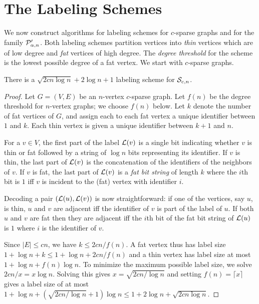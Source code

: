 
\section{The Labeling Schemes}
\label{sec:lab_schem}
We now construct algorithms for labeling schemes for $c$-sparse graphs and for the family $ \mathcal{P}'_{\alpha,n}$. Both labeling schemes partition vertices into \emph{thin} vertices which are of low degree and \emph{fat} vertices of high degree. The \emph{degree threshold} for the scheme is the lowest possible degree of a fat vertex. We start with $c$-sparse graphs.
\begin{theorem}\label{sparse-label}
There is a $\sqrt{2cn\log n} + 2\log n + 1$ labeling scheme for $ \mathcal{S}_{c,n}$.
\end{theorem}
\begin{proof}
Let $G=(V,E)$ be an $n$-vertex $c$-sparse graph. Let $f(n)$ be the degree threshold for $n$-vertex graphs; we choose $f(n)$ below. Let $k$ denote the number of fat vertices of $G$, and assign each to each fat vertex a unique identifier between $1$ and $k$. Each thin vertex is given a unique identifier between $k+1$ and $n$.

For a $v\in V$, the first part of the label $ \mathcal{L}(v)$ is a single bit indicating whether $v$ is thin or fat followed by a string of $\log n$ bits representing its identifier. If $v$ is thin, the last part of $ \mathcal{L}(v)$ is the concatenation of the identifiers of the neighbors of $v$. If $v$ is fat, the last part of $ \mathcal{L}(v)$ is a \emph{fat bit string} of length $k$ where the $i$th bit is $1$ iff $v$ is incident to the (fat) vertex with identifier $i$.

Decoding a pair $( \mathcal{L}(u), \mathcal{L}(v))$ is now straightforward: if one of the vertices, say $u$, is thin, $u$ and $v$ are adjacent iff the identifier of $v$ is part of the label of $u$. If both $u$ and $v$ are fat then they are adjacent iff the $i$th bit of the fat bit string of $ \mathcal{L}(u)$ is $1$ where $i$ is the identifier of $v$.

Since $|E|\leq cn$, we have $k\leq 2cn/f(n)$. A fat vertex thus has label size $1 + \log n + k\leq 1 + \log n + 2cn/f(n)$ and a thin vertex has label size at most $1 + \log n + f(n)\log n$. To minimize the maximum possible label size, we solve $2cn/x = x\log n$. Solving this gives $x = \sqrt{2cn/\log n}$ and setting $f(n) = \lceil x\rceil$ gives a label size of at most $1 + \log n + (\sqrt{2cn/\log n} + 1)\log n\leq 1 + 2\log n + \sqrt{2cn\log n}$.
\end{proof}

